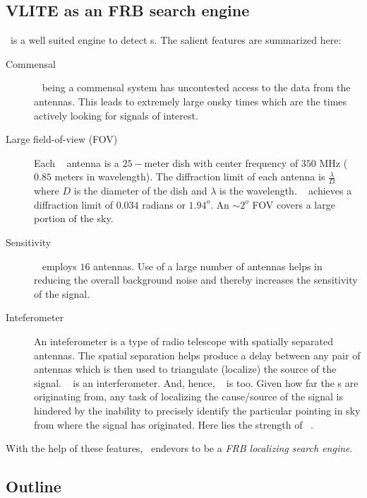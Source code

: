 \subsection{VLITE as an FRB search engine}
\label{ssub:vfrb}
\par \vlite~is a well suited engine to detect \frb{}s. The salient features are summarized here:
\begin{description}
	\item[Commensal] 
		\vlite~ being a commensal system has uncontested access to the data from the \vla antennas.
		This leads to extremely large onsky times which are the times actively looking for signals of interest.
	\item[Large field-of-view (FOV)]
		Each \vlite~ antenna is a $25-$meter dish with center frequency of $350$ MHz ($0.85$ meters in wavelength). 
		The diffraction limit of each antenna is $\frac{\lambda}{D}$ where $D$ is the diameter of the dish and $\lambda$ is the wavelength.  
		\vlite~ achieves a diffraction limit of $0.034$ radians or $1.94^o$. 
		An $\sim 2^o$ FOV covers a large portion of the sky. 

	\item[Sensitivity]
		\vlite~ employs $16$ antennas.
		Use of a large number of antennas helps in reducing the overall background noise and thereby increases the sensitivity of the signal.
	
	\item[Inteferometer]
		An inteferometer is a type of radio telescope with spatially separated antennas. 
		The spatial separation helps produce a delay between any pair of antennas which is then used to triangulate (localize) the source of the signal. 
		\vla~ is an interferometer. And, hence, \vlite~ is too.
		Given how far the \frb{}s are originating from, any task of localizing the cause/source of the signal is hindered by the inability to precisely identify the particular pointing in sky from where the signal has originated.
		Here lies the strength of \vlite~.
\end{description}

\par With the help of these features, \vlite~endevors to be a \emph{FRB localizing search engine}. 

\subsection{Outline}

